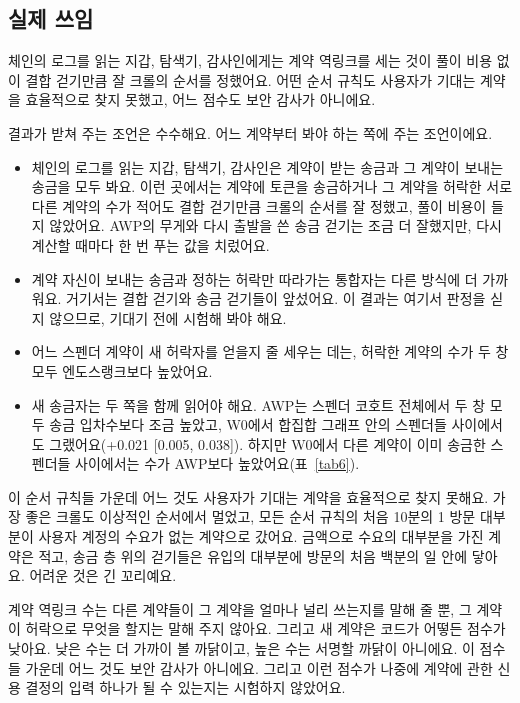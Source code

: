 \subsection{실제 쓰임}

\begin{yoji}
체인의 로그를 읽는 지갑, 탐색기, 감사인에게는 계약 역링크를 세는 것이 풀이 비용 없이 결합 걷기만큼 잘 크롤의 순서를 정했어요. 어떤 순서 규칙도 사용자가 기대는 계약을 효율적으로 찾지 못했고, 어느 점수도 보안 감사가 아니에요.
\end{yoji}

결과가 받쳐 주는 조언은 수수해요. 어느 계약부터 봐야 하는 쪽에 주는 조언이에요.
\begin{itemize}
\item 체인의 로그를 읽는 지갑, 탐색기, 감사인은 계약이 받는 송금과 그 계약이 보내는 송금을 모두 봐요. 이런 곳에서는 계약에 토큰을 송금하거나 그 계약을 허락한 서로 다른 계약의 수가 적어도 결합 걷기만큼 크롤의 순서를 잘 정했고, 풀이 비용이 들지 않았어요. AWP의 무게와 다시 출발을 쓴 송금 걷기는 조금 더 잘했지만, 다시 계산할 때마다 한 번 푸는 값을 치렀어요.
\item 계약 자신이 보내는 송금과 정하는 허락만 따라가는 통합자는 다른 방식에 더 가까워요. 거기서는 결합 걷기와 송금 걷기들이 앞섰어요. 이 결과는 여기서 판정을 싣지 않으므로, 기대기 전에 시험해 봐야 해요.
\item 어느 스펜더 계약이 새 허락자를 얻을지 줄 세우는 데는, 허락한 계약의 수가 두 창 모두 엔도스랭크보다 높았어요.
\item 새 송금자는 두 쪽을 함께 읽어야 해요. AWP는 스펜더 코호트 전체에서 두 창 모두 송금 입차수보다 조금 높았고, W0에서 합집합 그래프 안의 스펜더들 사이에서도 그랬어요(+0.021 [0.005, 0.038]). 하지만 W0에서 다른 계약이 이미 송금한 스펜더들 사이에서는 수가 AWP보다 높았어요(표~\ref{tab6}).
\end{itemize}

이 순서 규칙들 가운데 어느 것도 사용자가 기대는 계약을 효율적으로 찾지 못해요. 가장 좋은 크롤도 이상적인 순서에서 멀었고, 모든 순서 규칙의 처음 10분의 1 방문 대부분이 사용자 계정의 수요가 없는 계약으로 갔어요. 금액으로 수요의 대부분을 가진 계약은 적고, 송금 층 위의 걷기들은 유입의 대부분에 방문의 처음 백분의 일 안에 닿아요. 어려운 것은 긴 꼬리예요.

계약 역링크 수는 다른 계약들이 그 계약을 얼마나 널리 쓰는지를 말해 줄 뿐, 그 계약이 허락으로 무엇을 할지는 말해 주지 않아요. 그리고 새 계약은 코드가 어떻든 점수가 낮아요. 낮은 수는 더 가까이 볼 까닭이고, 높은 수는 서명할 까닭이 아니에요. 이 점수들 가운데 어느 것도 보안 감사가 아니에요. 그리고 이런 점수가 나중에 계약에 관한 신용 결정의 입력 하나가 될 수 있는지는 시험하지 않았어요.

